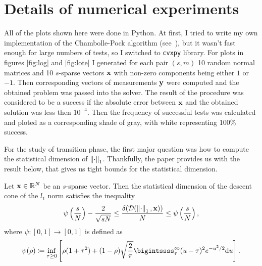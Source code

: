 \section{Details of numerical experiments}

All of the plots shown here were done in Python.
At first, I tried to write my own implementation of the Chambolle-Pock algorithm (see~\cite{chambolle}),
but it wasn't fast enough for large numbers of tests, so I switched to \texttt{cvxpy} library.
For plots in figures \ref{fig:log} and \ref{fig:lote} I generated for each pair $(s, m)$ 10 random normal matrices and
10 $s$-sparse vectors $\mathbf{x}$ with non-zero components being either $1$ or $-1$.
Then corresponding vectors of measurements $\mathbf{y}$ were computed and the obtained problem was passed into the solver.
The result of the procedure was considered to be a success if the absolute error between $\mathbf{x}$ and the obtained solution
was less then $10^{-4}$.
Then the frequency of successful tests was calculated and ploted as a corresponding shade of gray, with white representing 100\%
success.

For the study of transition phase, the first major question was how to compute the statistical dimension of $\left\Vert\cdot\right\Vert_1$.
Thankfully, the paper \cite{livingontheedge} provides us with the result below, that gives us tight bounds for the statistical dimension.

\begin{proposition}
    Let $\mathbf{x} \in \mathbb{R}^N$ be an $s$-sparse vector.
    Then the statistical dimension of the descent cone of the $l_1$ norm satisfies the inequality
    \begin{equation}
        \psi\left( \frac{s}{N} \right) - \frac{2}{\sqrt{sN}} \leq \frac{\delta(\mathcal{D}(\left\Vert\cdot\right\Vert_1, \mathbf{x}))}{N}
        \leq \psi\left( \frac{s}{N} \right),
    \end{equation}
    where $\psi:[0,1] \rightarrow [0, 1]$ is defined as
    \begin{equation} \label{eq:inf}
        \psi(\rho) \coloneq \inf_{\tau \geq 0} \left[ \rho (1+\tau^2) +
        (1-\rho) \sqrt{\frac{2}{\pi}} \bigintssss_\tau^\infty  (u-\tau)^2  e^{-u^2/2}\mathrm{d}u \right].
    \end{equation}
\end{proposition}


